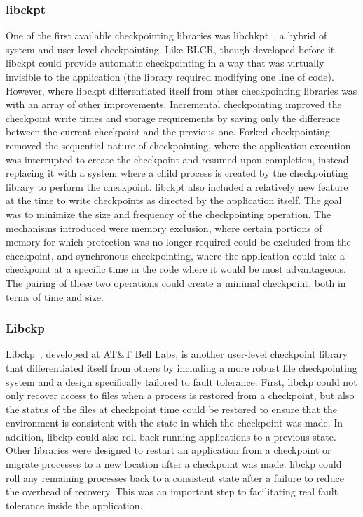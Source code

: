 \subsubsection{libckpt}

One of the first available checkpointing libraries was libchkpt~\cite{Plank:1995wz}, a 
hybrid of system and user-level checkpointing. Like BLCR, though developed before it, 
libckpt could provide automatic checkpointing in a way that was virtually invisible to 
the application (the library required modifying one line of code). However, 
where libckpt differentiated itself from other checkpointing libraries was with an array of 
other improvements. Incremental checkpointing improved the checkpoint write 
times and storage requirements by saving only the difference between the current checkpoint and the 
previous one. Forked checkpointing removed the sequential nature of 
checkpointing, where the application execution was interrupted to create the 
checkpoint and resumed upon completion, instead replacing it with a system where a child process is created 
by the checkpointing library to perform the checkpoint. libckpt also included a 
relatively new feature at the time to write checkpoints as directed by the 
application itself. The goal was to minimize the size and frequency of the 
checkpointing operation. The mechanisms introduced were memory exclusion, where 
certain portions of memory for which protection was no longer required could be 
excluded from the checkpoint, and synchronous checkpointing, where the 
application could take a checkpoint at a specific time in the code where it 
would be most advantageous. The pairing of these two operations could create a 
minimal checkpoint, both in terms of time and size.

\subsubsection{Libckp}

Libckp~\cite{Wang:1995gn}, developed at AT\&T Bell Labs, is another user-level 
checkpoint library that differentiated itself from others by including a more robust 
file checkpointing system and a design specifically tailored to fault tolerance. 
First, libckp could not only recover access to files when a process is restored 
from a checkpoint, but also the status of the files at checkpoint time could be 
restored to ensure that the environment is consistent with the state in which 
the checkpoint was made. In addition, libckp could also roll back running 
applications to a previous state. Other libraries were designed to restart an 
application from a checkpoint or migrate processes to a new location after a 
checkpoint was made. libckp could roll any remaining processes back to a 
consistent state after a failure to reduce the overhead of recovery. This was an 
important step to facilitating real fault tolerance inside the application.

